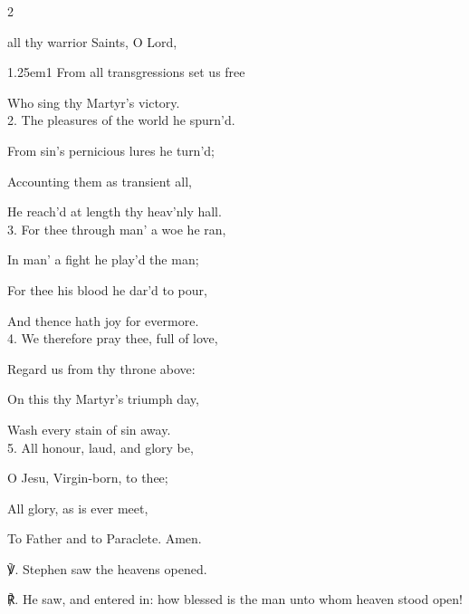 \begin{paracol}{2}

\switchcolumn

\secondEvensong


\secondEvensongHymn\label{StephenEvensong}

 all thy warrior Saints, O Lord,


\begin{hangparas}{1.25em}{1}
From all transgressions set us free

Who sing thy Martyr's victory.\\

2. The pleasures of the world he spurn'd.

From sin's pernicious lures he turn'd;

Accounting them as transient all,

He reach'd at length thy heav'nly hall.\\

3. For thee through man' a woe he ran,

In man' a fight he play'd the man;

For thee his blood he dar'd to pour,

And thence hath joy for evermore.\\

4. We therefore pray thee, full of love,

Regard us from thy throne above:

On this thy Martyr's triumph day,

Wash every stain of sin away.\\

5. All honour, laud, and glory be,

O Jesu, Virgin-born, to thee;

All glory, as is ever meet,

To Father and to Paraclete. Amen.\\
\end{hangparas}

℣. Stephen saw the heavens opened.

℟. He saw, and entered in: how blessed is the man unto whom heaven stood open!


\fussy	
\end{paracol}

